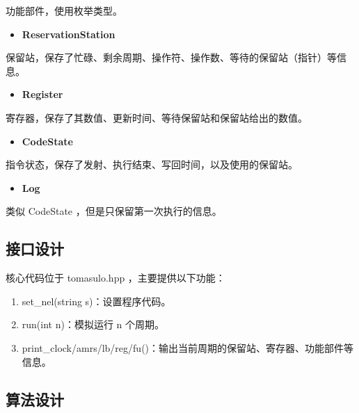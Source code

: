\documentclass{article}
\begin{document}
功能部件，使用枚举类型。


\begin{itemize}
\item
\textbf{ReservationStation}
\end{itemize}



保留站，保存了忙碌、剩余周期、操作符、操作数、等待的保留站（指针）等信息。


\begin{itemize}
\item
\textbf{Register}
\end{itemize}



寄存器，保存了其数值、更新时间、等待保留站和保留站给出的数值。


\begin{itemize}
\item
\textbf{CodeState}
\end{itemize}



指令状态，保存了发射、执行结束、写回时间，以及使用的保留站。


\begin{itemize}
\item
\textbf{Log}
\end{itemize}



类似 CodeState ，但是只保留第一次执行的信息。


\subsection{接口设计}




核心代码位于 tomasulo.hpp ，主要提供以下功能：


\begin{enumerate}
\item
set\_nel(string s)：设置程序代码。
\item
run(int n)：模拟运行 n 个周期。
\item
print\_clock/amrs/lb/reg/fu()：输出当前周期的保留站、寄存器、功能部件等信息。
\end{enumerate}



\subsection{算法设计}
\end{document}
